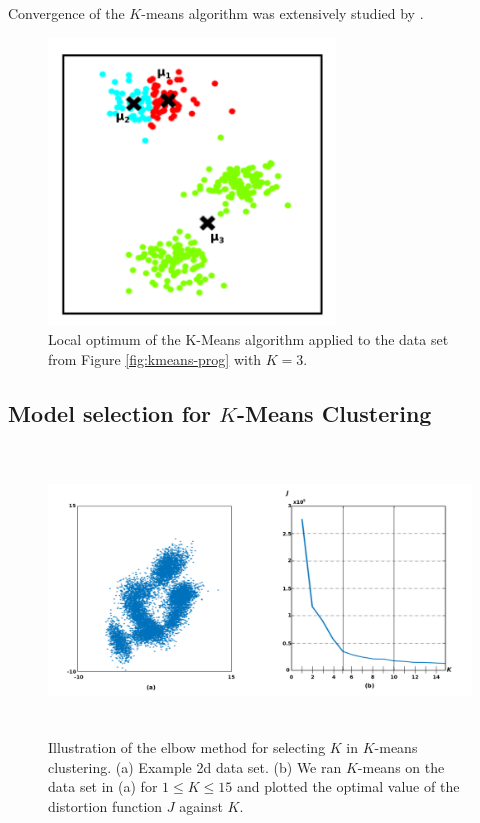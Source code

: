 \documentclass[final,3p,times,twocolumn]{elsarticle}
\begin{document}
Convergence of the $K$-means algorithm was extensively studied by \cite{macqueen1967}.

\begin{figure}
\centering
\includegraphics[width=3in]{local.png}
\caption{Local optimum of the K-Means algorithm applied to the data set from Figure \ref{fig:kmeans-prog} with $K=3$.}
\label{fig:kmeans-local}
\end{figure}


\subsection{Model selection for $K$-Means Clustering}
\label{sect:kmeans-ms}

\begin{figure}
\centering
\includegraphics[width=\textwidth,height=3in]{elbow.png}
\caption{Illustration of the elbow method for selecting $K$ in $K$-means clustering. 
(a) Example 2d data set.
(b) We ran $K$-means on the data set in (a) for $1\leq K\leq 15$ and plotted the optimal value of the distortion function $J$ against $K$.}
\label{fig:kmeans-elbow}
\end{figure}
\end{document}
